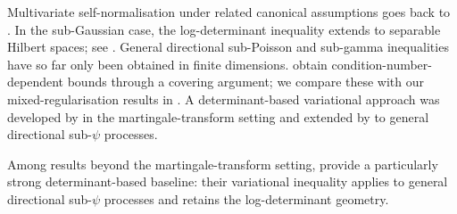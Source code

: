 \documentclass[11pt]{article}
\let\cref\zcref
\begin{document}
Multivariate self-normalisation under related canonical assumptions goes back to \citet{delapena2004selfnormalized,delapena2009selfnormalized}. In the sub-Gaussian case, the log-determinant inequality extends to separable Hilbert spaces; see \citet[Cor.~3.5]{abbasiyadkori2013online}. General directional sub-Poisson and sub-gamma inequalities have so far only been obtained in finite dimensions. \citet{whitehouse2026timeuniform} obtain condition-number-dependent bounds through a covering argument; we compare these with our mixed-regularisation results in \cref{sec:condition-num}. A determinant-based variational approach was developed by \citet{ziemann2025vector} in the martingale-transform setting and extended by \citet{chugg2025variational} to general directional sub-$\psi$ processes.

Among results beyond the martingale-transform setting, \citet{chugg2025variational} provide a particularly strong determinant-based baseline: their variational inequality applies to general directional sub-$\psi$ processes and retains the log-determinant geometry.
\end{document}
